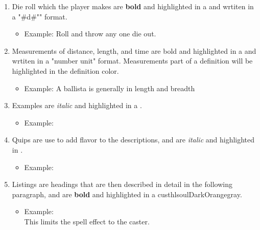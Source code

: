 \begin{enumerate}[leftmargin=12pt]
\item Die roll which the player makes are \textbf{bold} and highlighted in a   and wrtiten in a "\#d\#"" format.
	\begin{itemize}\item Example: Roll  and throw any one die out.\end{itemize}
\item Measurements of distance, length, and time are bold and highlighted in   a and wrtiten in a "number unit" format. Measurements part of a definition will be highlighted in the definition color.
	\begin{itemize}\item Example: A ballista is generally  in length and breadth\end{itemize}
\item Examples are \textit{italic} and highlighted in a .
	\begin{itemize}\item Example: \end{itemize}
\item Quips are use to add flavor to the descriptions, and are \textit{italic} and highlighted in .
	\begin{itemize}\item Example: \end{itemize}
\item Listings are headings that are then described in detail in the following paragraph, and are \textbf{bold} and highlighted in a custhl{soulDarkOrange}{gray}.
	\begin{itemize}\item Example: \\
This limits the spell effect to the caster.\end{itemize}
\end{enumerate}
